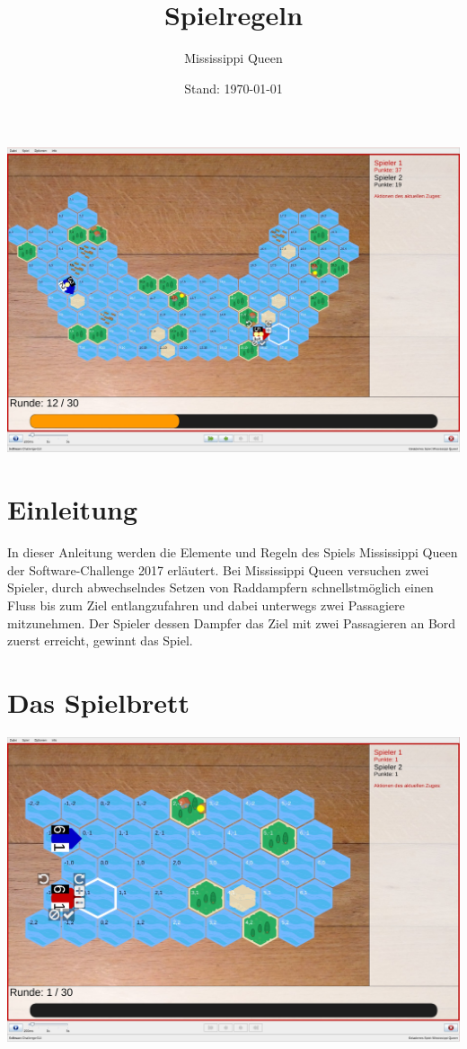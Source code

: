 \documentclass[12pt,a4paper, ngerman, oneside]{scrartcl}
\title{Spielregeln}
\subtitle{Mississippi Queen}
\date{Stand: \today}
\begin{document}
\maketitle
\includegraphics[width=\textwidth]{bilder/spielfeld-gross.jpg}
\vspace*{\fill}

\newpage
\tableofcontents
\thispagestyle{empty}
\newpage
\setcounter{page}{1}

\section{Einleitung}

In dieser Anleitung werden die Elemente und Regeln des Spiels Mississippi Queen
der Software-Challenge 2017 erläutert. Bei Mississippi Queen versuchen zwei
Spieler, durch abwechselndes Setzen von Raddampfern schnellstmöglich einen Fluss
bis zum Ziel entlangzufahren und dabei unterwegs zwei Passagiere mitzunehmen.
Der Spieler dessen Dampfer das Ziel mit zwei Passagieren an Bord zuerst
erreicht, gewinnt das Spiel.


\section{Das Spielbrett}

\includegraphics[width=\textwidth]{bilder/spielfeld-anfang.jpg}
\end{document}
